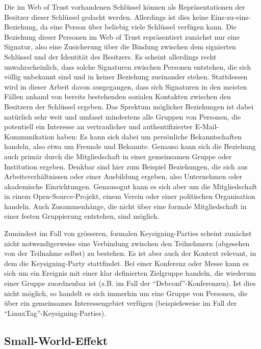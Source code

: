 Die im Web of Trust vorhandenen Schl\"ussel k\"onnen als
Repr\"asentationen der Besitzer dieser Schl\"ussel gedacht
werden. Allerdings ist dies keine Eins-zu-eins-Beziehung, da eine
Person \"uber beliebig viele Schl\"ussel verf\"ugen kann. Die
Beziehung dieser Personen im Web of Trust repr\"asentiert zun\"achst
nur eine Signatur, also eine Zusicherung \"uber die Bindung zwischen
dem signierten Schl\"ussel und der Identit\"at des Besitzers. Es
scheint allerdings recht unwahrscheinlich, dass solche Signaturen
zwischen Personen entstehen, die sich v\"ollig unbekannt sind und in
keiner Beziehung zueinander stehen. Stattdessen wird in dieser Arbeit
davon ausgegangen, dass sich Signaturen in den meisten F\"allen anhand
von bereits bestehenden sozialen Kontakten zwischen den Besitzern der
Schl\"ussel ergeben\cite{Capkun2002}. Das Sprektum m\"oglicher
Beziehungen ist dabei nat\"urlich sehr weit und umfasst mindestens
alle Gruppen von Personen, die potentiell ein Interesse an
vertraulicher und authentifizierter E-Mail-Kommunikation haben: Es
kann sich dabei um pers\"onliche Bekanntschaften handeln, also etwa um
Freunde und Bekannte. Genauso kann sich die Beziehung auch prim\"ar
durch die Mitgliedschaft in einer gemeinsamen Gruppe oder Institution
ergeben. Denkbar sind hier zum Beispiel Beziehungen, die sich aus
Arbeitsverh\"altnissen oder einer Ausbildung ergeben, also Unternehmen
oder akademische Einrichtungen. Genausogut kann es sich aber um die
Mitgliedschaft in einem Open-Source-Projekt, einem Verein oder einer
politischen Organisation handeln. Auch Zusammenh\"ange, die nicht
\"uber eine formale Mitgliedschaft in einer festen Gruppierung
entstehen, sind m\"oglich.

Zumindest im Fall von gr\"osseren, formalen Keysigning-Parties scheint
zun\"achst nicht notwendigerweise eine Verbindung zwischen den
Teilnehmern (abgesehen von der Teilnahme selbst) zu bestehen. Es ist
aber auch der Kontext relevant, in dem die Keysigning-Party
stattfindet. Bei einer Konferenz oder Messe kann es sich um ein
Ereignis mit einer klar definierten Zielgruppe handeln, die wiederum
einer Gruppe zuordnenbar ist (z.B. im Fall der
``Debconf''-Konferenzen). Ist dies nicht m\"oglich, so handelt es sich
immerhin um eine Gruppe von Personen, die \"uber ein gemeinsames
Interessengebiet verf\"ugen (beispielsweise im Fall der
``LinuxTag''-Keysigning-Parties).

\subsection{Small-World-Effekt}
\label{sec:small-world-effekt}

